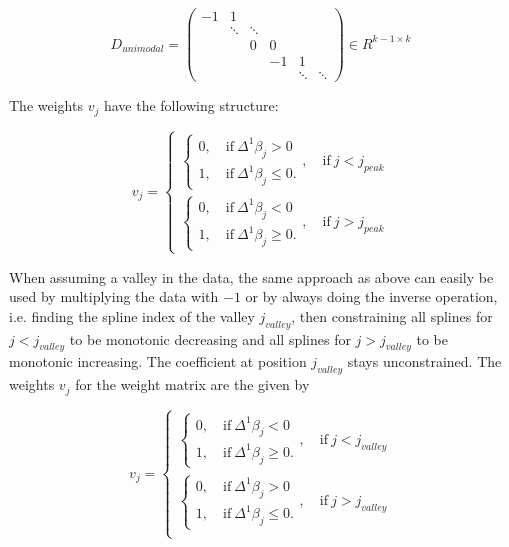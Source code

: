 \documentclass[10pt,a4paper]{article}
\begin{document}
	$$D_{unimodal} = \begin{pmatrix} -1 & 1 \\ 
									    & \ddots & \ddots  \\
									    & & 0 & 0 \\ 
									    & & & -1 & 1 \\
									    & & & &  \ddots & \ddots 
					 \end{pmatrix} \in R^{k-1 \times k}$$
	
	The weights $v_j$ have the following structure:
	
	$$v_j = \begin{cases} \begin{cases} 0, \quad \text{if} \ \Delta^1\beta_j > 0 \\ 
	1, \quad \text{if} \ \Delta^1\beta_j \le 0.\end{cases}, \quad \text{if} \ j < j_{peak} \\ \begin{cases} 0, \quad \text{if} \ \Delta^1\beta_j < 0 \\ 
	1, \quad \text{if} \ \Delta^1\beta_j \ge 0.\end{cases}  , \quad \text{if} \ j > j_{peak}  \end{cases}$$
	
	When assuming a valley in the data, the same approach as above can easily be used by multiplying the data with $-1$ or by always doing the inverse operation, i.e. finding the spline index of the valley $j_{valley}$, then constraining all splines for $j < j_{valley}$ to be monotonic decreasing and all splines for $j > j_{valley}$ to be monotonic increasing. The coefficient at position $j_{valley}$ stays unconstrained. The weights $v_j$ for the weight matrix are the given by
	
	$$v_j = \begin{cases}\begin{cases} 0, \quad \text{if} \ \Delta^1\beta_j < 0 \\ 
	1, \quad \text{if} \ \Delta^1\beta_j \ge 0.\end{cases}  , \quad \text{if} \ j < j_{valley}  \\ \begin{cases} 0, \quad \text{if} \ \Delta^1\beta_j > 0 \\ 
	1, \quad \text{if} \ \Delta^1\beta_j \le 0.\end{cases}, \quad \text{if} \ j > j_{valley} \\ \end{cases}$$
	
\end{document}
